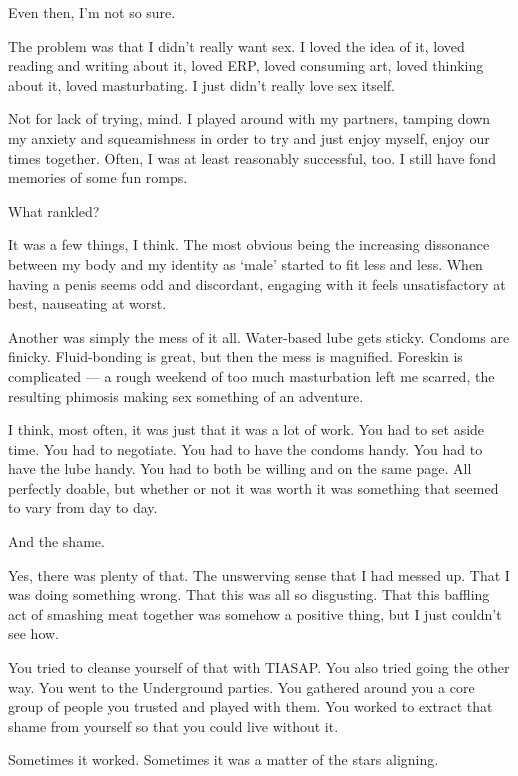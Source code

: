 Even then, I'm not so sure.
\newpage

\noindent The problem was that I didn't really want sex. I loved the idea of it, loved reading and writing about it, loved ERP, loved consuming art, loved thinking about it, loved masturbating. I just didn't really love sex itself.

Not for lack of trying, mind. I played around with my partners, tamping down my anxiety and squeamishness in order to try and just enjoy myself, enjoy our times together. Often, I was at least reasonably successful, too. I still have fond memories of some fun romps.

\begin{ally}
What rankled?
\end{ally}
It was a few things, I think. The most obvious being the increasing dissonance between my body and my identity as `male' started to fit less and less. When having a penis seems odd and discordant, engaging with it feels unsatisfactory at best, nauseating at worst.

Another was simply the mess of it all. Water-based lube gets sticky. Condoms are finicky. Fluid-bonding is great, but then the mess is magnified. Foreskin is complicated --- a rough weekend of too much masturbation left me scarred, the resulting phimosis making sex something of an adventure.

I think, most often, it was just that it was a lot of work. You had to set aside time. You had to negotiate. You had to have the condoms handy. You had to have the lube handy. You had to both be willing and on the same page. All perfectly doable, but whether or not it was worth it was something that seemed to vary from day to day.

\begin{ally}
And the shame.
\end{ally}
Yes, there was plenty of that. The unswerving sense that I had messed up. That I was doing something wrong. That this was all so disgusting. That this baffling act of smashing meat together was somehow a positive thing, but I just couldn't see how.

\begin{ally}
You tried to cleanse yourself of that with TIASAP. You also tried going the other way. You went to the Underground parties. You gathered around you a core group of people you trusted and played with them. You worked to extract that shame from yourself so that you could live without it.
\end{ally}
Sometimes it worked. Sometimes it was a matter of the stars aligning.


